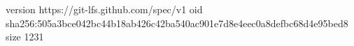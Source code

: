 version https://git-lfs.github.com/spec/v1
oid sha256:505a3bce042bc44b18ab426c42ba540ac901e7d8e4eec0a8defbc68d4e95bed8
size 1231
